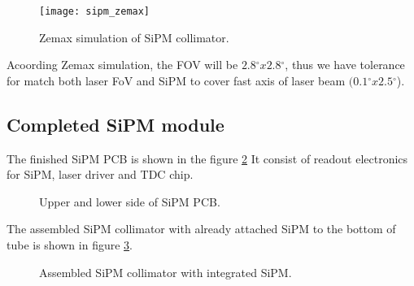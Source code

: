 \begin{figure}[H]
\texttt{[image: sipm\_zemax]}
\caption{Zemax simulation of SiPM collimator.}
\label{fig:sipm_pde}
\end{figure}

Acoording Zemax simulation, the FOV will be $2.8{^\circ}x2.8{^\circ}$,
thus we have tolerance for match both laser FoV and SiPM to cover fast axis of laser beam $(0.1{^\circ}x2.5{^\circ}$).

\subsection{Completed SiPM module}

The finished SiPM PCB is shown in the figure \ref{fig:sipm_PCB}
It consist of readout electronics for SiPM, laser driver and TDC chip.

\begin{figure}[h]
  \caption{Upper and lower side of SiPM PCB.}%
\label{fig:sipm_PCB} %
\end{figure}

The assembled SiPM collimator with already attached SiPM to the bottom of tube is shown in figure \ref{fig:sipm_collimator}.
\begin{figure}[h]
  \caption{Assembled SiPM collimator with integrated SiPM.}%
\label{fig:sipm_collimator} %
\end{figure}




